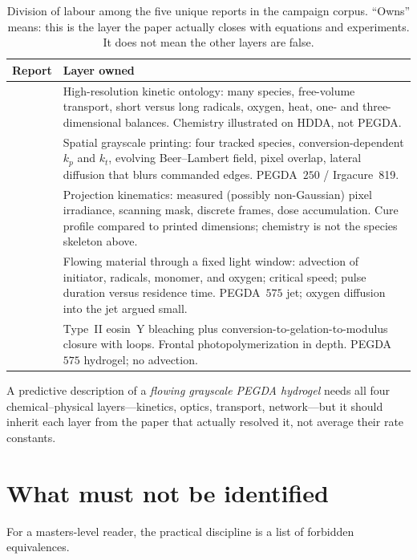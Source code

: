 \documentclass[11pt,a4paper]{article}
\begin{document}
\begin{table}[htbp]
\centering
\caption{Division of labour among the five unique reports in the campaign corpus.
``Owns'' means: this is the layer the paper actually closes with equations and experiments.
It does not mean the other layers are false.}
\label{tab:papers}
\small
\begin{tabular}{@{}p{}p{}@{}}
\toprule
Report & Layer owned \\
\midrule
\citet{Dobson2024} &
High-resolution kinetic ontology: many species, free-volume transport, short versus long radicals, oxygen, heat, one- and three-dimensional balances.
Chemistry illustrated on HDDA, not PEGDA.
\\
\citet{Montgomery2022} &
Spatial grayscale printing: four tracked species, conversion-dependent $k_p$ and $k_t$, evolving Beer--Lambert field, pixel overlap, lateral diffusion that blurs commanded edges.
PEGDA~$250$ / Irgacure~819.
\\
\citet{Meenakshisundaram2020} &
Projection kinematics: measured (possibly non-Gaussian) pixel irradiance, scanning mask, discrete frames, dose accumulation.
Cure profile compared to printed dimensions; chemistry is not the species skeleton above.
\\
\citet{Slutzky2019} &
Flowing material through a fixed light window: advection of initiator, radicals, monomer, and oxygen; critical speed; pulse duration versus residence time.
PEGDA~$575$ jet; oxygen diffusion into the jet argued small.
\\
\citet{Zhu2020} &
Type~II eosin~Y bleaching plus conversion-to-gelation-to-modulus closure with loops.
Frontal photopolymerization in depth.
PEGDA~$575$ hydrogel; no advection.
\\
\bottomrule
\end{tabular}
\end{table}

A predictive description of a \emph{flowing grayscale PEGDA hydrogel} needs all four chemical--physical layers---kinetics, optics, transport, network---but it should inherit each layer from the paper that actually resolved it, not average their rate constants.

\section{What must not be identified}

For a masters-level reader, the practical discipline is a list of forbidden equivalences.
\end{document}
